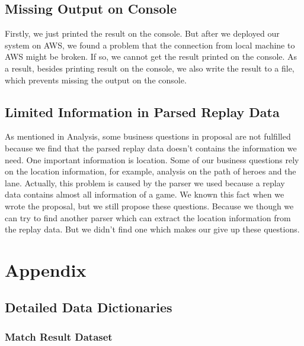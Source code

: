 \documentclass{article}
\begin{document}
\subsection{Missing Output on Console}

Firstly, we just printed the result on the console.
But after we deployed our system on AWS, we found a problem that the connection from local machine to AWS might be broken.
If so, we cannot get the result printed on the console.
As a result, besides printing result on the console, we also write the result to a file, which prevents missing the output on the console.

\subsection{Limited Information in Parsed Replay Data}

As mentioned in Analysis, some business questions in proposal are not fulfilled because we find that the parsed replay data doesn't contains the information we need. One important information is location. Some of our business questions rely on the location information, for example, analysis on the path of heroes and the lane. Actually, this problem is caused by the parser we used because a replay data contains almost all information of a game. We known this fact when we wrote the proposal, but we still propose these questions. Because we though we can try to find another parser which can extract the location information from the replay data. But we didn't find one which makes our give up these questions.

\printglossary

\section{Appendix}

\subsection{Detailed Data Dictionaries}

\subsubsection{Match Result Dataset}
\end{document}
